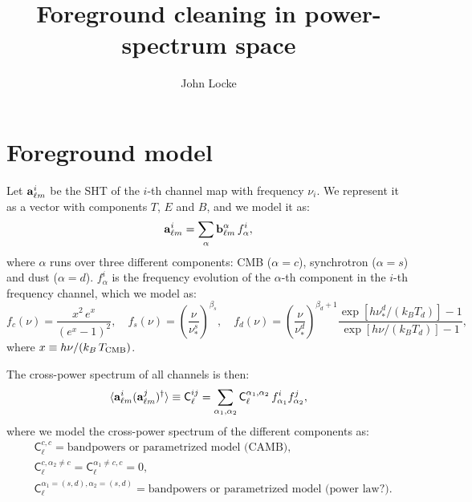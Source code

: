 \documentclass[a4paper,10pt]{article}
\title{Foreground cleaning in power-spectrum space}
\author{John Locke}
\begin{document}
\maketitle

\section{Foreground model}
Let ${\bf a}_{\ell m}^i$ be the SHT of the $i$-th channel map with frequency $\nu_i$. We represent it as a vector with
components $T$, $E$ and $B$, and we model it as:
\begin{equation}
 {\bf a}_{\ell m}^i=\sum_{\alpha}{\bf b}_{\ell m}^\alpha\,f_\alpha^i,
\end{equation}
where $\alpha$ runs over three different components: CMB ($\alpha=c$), synchrotron ($\alpha=s$)
and dust ($\alpha=d$). $f^i_\alpha$ is the frequency evolution of the $\alpha$-th component
in the $i$-th frequency channel, which we model as:
\begin{equation}
  f_c(\nu)=\frac{x^2\,e^x}{(e^x-1)^2},\hspace{12pt}
  f_s(\nu)=\left(\frac{\nu}{\nu_*^s}\right)^{\beta_s},\hspace{12pt}
  f_d(\nu)=\left(\frac{\nu}{\nu_*^d}\right)^{\beta_d+1}
  \frac{\exp[h\nu_*^d/(k_BT_d)]-1}{\exp[h\nu/(k_BT_d)]-1},
\end{equation}
where $x\equiv h\nu/(k_B\,T_{\rm CMB})$.

The cross-power spectrum of all channels is then:
\begin{equation}
 \langle {\bf a}^i_{\ell m}({\bf a}^j_{\ell m})^\dag\rangle\equiv \mathsf{C}^{ij}_\ell=
 \sum_{\alpha_1,\alpha_2}\mathsf{C}^{\alpha_1,\alpha_2}_\ell\,
 f^{i}_{\alpha_1}f^{j}_{\alpha_2},
\end{equation}
where we model the cross-power spectrum of the different components as:
\begin{align}
 & \mathsf{C}_\ell^{c,c}=\text{bandpowers or parametrized model (CAMB)},\\
 & \mathsf{C}_\ell^{c,\alpha_2\neq c}=\mathsf{C}_\ell^{\alpha_1\neq c,c}=0,\\
 & \mathsf{C}_\ell^{\alpha_1=(s,d),\alpha_2=(s,d)}=\text{bandpowers or parametrized model (power law?)}.
\end{align}
\end{document}
